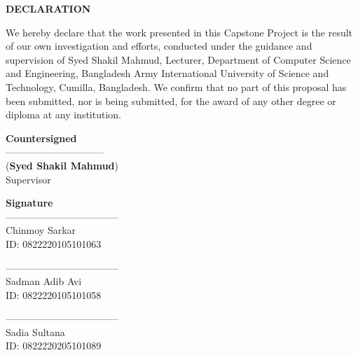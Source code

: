 \documentclass[12pt,a4paper]{report}
\begin{document}
\clearpage
\thispagestyle{plain}

\begin{center}
    \textbf{\Large DECLARATION}
\end{center}

\vspace{0.5cm}


We hereby declare that the work presented in this Capstone Project is the result of our own investigation and efforts, conducted under the guidance and supervision of Syed Shakil Mahmud, Lecturer, Department of Computer Science and Engineering, Bangladesh Army International University of Science and Technology, Cumilla, Bangladesh. We confirm that no part of this proposal has been submitted, nor is being submitted, for the award of any other degree or diploma at any institution.

\vspace{2cm}

\noindent
\begin{minipage}[t]{0.48\textwidth}
    \centering
    \textbf{Countersigned} \\[1.5cm]

    ------------------------------ \\
    (\textbf{Syed Shakil Mahmud}) \\
    Supervisor
\end{minipage}
\hfill
\begin{minipage}[t]{0.48\textwidth}
    \centering
    \textbf{Signature} \\[1.5cm]

    ----------------------------------- \\
    Chinmoy Sarkar \\
    ID: 0822220105101063

    \vspace{1.5cm}

    ----------------------------------- \\
    Sadman Adib Avi \\
    ID: 0822220105101058

    \vspace{1.5cm}

    ----------------------------------- \\
    Sadia Sultana \\
    ID: 0822220205101089
\end{minipage}
\clearpage
\end{document}
